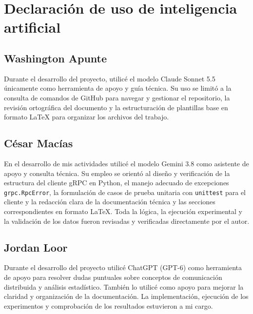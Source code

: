 \section{Declaración de uso de inteligencia artificial}

\subsection{Washington Apunte}

Durante el desarrollo del proyecto, utilicé el modelo Claude Sonnet 5.5 únicamente como herramienta de apoyo y guía técnica. Su uso se limitó a la consulta de comandos de GitHub para navegar y gestionar el repositorio, la revisión ortográfica del documento y la estructuración de plantillas base en formato LaTeX para organizar los archivos del trabajo.

\subsection{César Macías}

En el desarrollo de mis actividades utilicé el modelo Gemini 3.8 como asistente de apoyo y consulta técnica. Su empleo se orientó al diseño y verificación de la estructura del cliente gRPC en Python, el manejo adecuado de excepciones \texttt{grpc.RpcError}, la formulación de casos de prueba unitaria con \texttt{unittest} para el cliente y la redacción clara de la documentación técnica y las secciones correspondientes en formato \LaTeX{}. Toda la lógica, la ejecución experimental y la validación de los datos fueron revisadas y verificadas directamente por el autor.

\subsection{Jordan Loor}

Durante el desarrollo del proyecto utilicé ChatGPT (GPT-6) como
herramienta de apoyo para resolver dudas puntuales sobre conceptos
de comunicación distribuida y análisis estadístico.
También lo utilicé como apoyo para mejorar la claridad y
organización de la documentación. La implementación, ejecución
de los experimentos y comprobación de los resultados estuvieron
a mi cargo.
